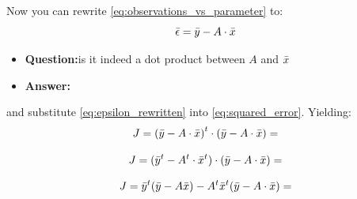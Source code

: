 \noindent Now you can rewrite \cref{eq:observations_vs_parameter} to:
\begin{equation}
    \Bar{\epsilon}=\Bar{y}-A\cdot\Bar{x}
    \label{eq:epsilon_rewritten}
\end{equation}
\begin{itemize}
    \item \textbf{Question:}is it indeed a dot product between $A$ and $\Bar{x}$
    \item \textbf{Answer:}
\end{itemize}
and substitute \cref{eq:epsilon_rewritten} into \cref{eq:squared_error}. Yielding:
\begin{equation}
    J={(\Bar{y}-A\cdot\Bar{x})}^t\cdot(\Bar{y}-A\cdot\Bar{x}) =
\end{equation}

\begin{equation}
    J={(\Bar{y}^t-A^t\cdot\Bar{x}^t)}\cdot(\Bar{y}-A\cdot\Bar{x}) =
\end{equation}

\begin{equation}
    J=\Bar{y}^t(\Bar{y}-A\Bar{x})-A^t\Bar{x}^t(\Bar{y}-A\cdot\Bar{x}) =
    \label{eq:cost_function}
\end{equation}

